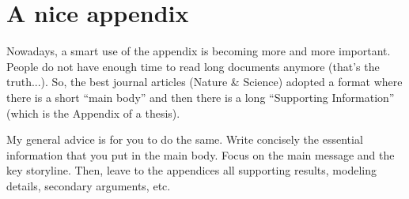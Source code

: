 \chapter{A nice appendix}
\label{app:appendix_a}

\graphicspath{{appendix_a/figures/}} %

Nowadays, a smart use of the appendix is becoming more and more important. People do not have enough time to read long documents anymore (that's the truth...). So, the best journal articles (Nature \& Science) adopted a format where there is a short ``main body'' and then there is a long ``Supporting Information'' (which is the Appendix of a thesis).

My general advice is for you to do the same. Write concisely the essential information that you put in the main body. Focus on the main message and the key storyline. Then, leave to the appendices all supporting results, modeling details, secondary arguments, etc.